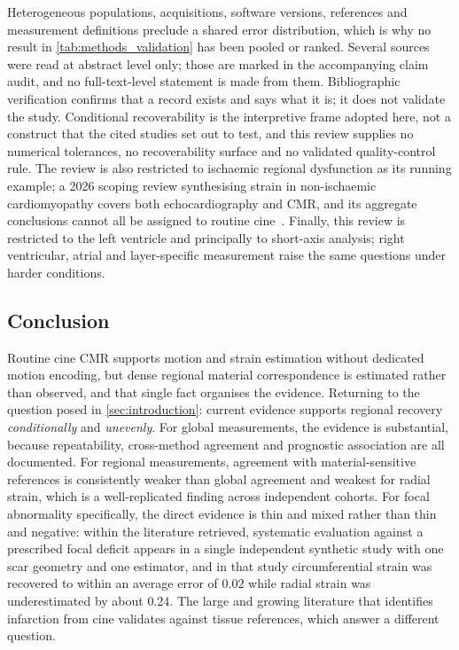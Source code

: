 Heterogeneous populations,
acquisitions, software versions, references and measurement definitions preclude a shared error
distribution, which is why no result in \cref{tab:methods_validation} has been pooled or ranked.
Several sources were read at abstract level only; those are marked in the accompanying claim audit,
and no full-text-level statement is made from them. Bibliographic verification confirms that a
record exists and says what it is; it does not validate the study. Conditional recoverability is the
interpretive frame adopted here, not a construct that the cited studies set out to test, and this
review supplies no numerical tolerances, no recoverability surface and no validated quality-control
rule. The review is also restricted to ischaemic regional dysfunction as its running example; a 2026
scoping review synthesising strain in non-ischaemic cardiomyopathy covers both echocardiography and
CMR, and its aggregate conclusions cannot all be assigned to routine cine~\citep{mohammed2026}.
Finally, this review is restricted to the left ventricle and principally to short-axis analysis; right ventricular, atrial and layer-specific measurement raise the same questions under
harder conditions.

\subsection{Conclusion}\label{sec:conclusion}

Routine cine CMR supports motion and strain estimation without dedicated motion encoding, but dense
regional material correspondence is estimated rather than observed, and that single fact organises
the evidence. Returning to the question posed in \cref{sec:introduction}: current evidence supports
regional recovery \emph{conditionally} and \emph{unevenly}. For global measurements, the evidence is
substantial, because repeatability, cross-method agreement and prognostic association are all
documented.
For regional measurements, agreement with material-sensitive references is consistently weaker than
global agreement and weakest for radial strain, which is a well-replicated finding across
independent cohorts. For focal abnormality specifically, the direct evidence is thin and mixed
rather than thin and negative: within the literature retrieved, systematic evaluation against a
prescribed focal deficit appears in a single independent synthetic study with one scar geometry and
one estimator, and in that study circumferential strain was recovered to within an average error of
$0.02$ while radial strain was underestimated by about $0.24$. The large and growing literature that
identifies infarction from cine validates against tissue references, which answer a different
question.

